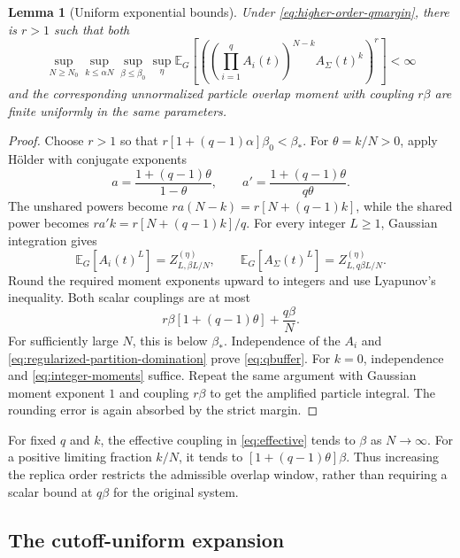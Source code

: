 \documentclass[11pt,reqno]{amsart}
\numberwithin{equation}{section}
\theoremstyle{plain}
\newtheorem{lemma}[lemma]{Lemma}
\theoremstyle{definition}
\newcommand{\E}{\mathbb E}
\newcommand{\be}{\beta}
\begin{document}
\begin{lemma}[Uniform exponential bounds]\label{lem:qbuffer}
Under \eqref{eq:higher-order-qmargin}, there is $r>1$ such that both
\begin{equation}\label{eq:qbuffer}
 \sup_{N\geq N_0}\sup_{k\leq\alpha N}\sup_{\be\leq\be_0}\sup_\eta
 \E_G\left[\left(\left(\prod_{i=1}^q A_i(t)\right)^{N-k}
 A_\Sigma(t)^k\right)^r\right]<\infty
\end{equation}
and the corresponding unnormalized particle overlap moment with coupling $r\be$ are finite uniformly in the same parameters.
\end{lemma}
\begin{proof}
Choose $r>1$ so that $r[1+(q-1)\alpha]\be_0<\be_*$. For $\theta=k/N>0$, apply H\"older with conjugate exponents
\begin{equation}\label{eq:Holder}
 a=\frac{1+(q-1)\theta}{1-\theta},\qquad
 a'=\frac{1+(q-1)\theta}{q\theta}.
\end{equation}
The unshared powers become $ra(N-k)=r[N+(q-1)k]$, while the shared power becomes $ra'k=r[N+(q-1)k]/q$. For every integer $L\geq1$, Gaussian integration gives
\begin{equation}\label{eq:integer-moments}
 \E_G[A_i(t)^L]=Z_{L,\be L/N}^{(\eta)},\qquad
 \E_G[A_\Sigma(t)^L]=Z_{L,q\be L/N}^{(\eta)}.
\end{equation}
Round the required moment exponents upward to integers and use Lyapunov's inequality. Both scalar couplings are at most
\begin{equation}\label{eq:effective}
 r\be[1+(q-1)\theta]+\frac{q\be}{N}.
\end{equation}
For sufficiently large $N$, this is below $\be_*$. Independence of the $A_i$ and \eqref{eq:regularized-partition-domination} prove \eqref{eq:qbuffer}. For $k=0$, independence and \eqref{eq:integer-moments} suffice. Repeat the same argument with Gaussian moment exponent $1$ and coupling $r\be$ to get the amplified particle integral. The rounding error is again absorbed by the strict margin.
\end{proof}

For fixed $q$ and $k$, the effective coupling in \eqref{eq:effective} tends to $\be$ as $N\to\infty$. For a positive limiting fraction $k/N$, it tends to $[1+(q-1)\theta]\be$. Thus increasing the replica order restricts the admissible overlap window, rather than requiring a scalar bound at $q\be$ for the original system.

\subsection{The cutoff-uniform expansion}
\end{document}
